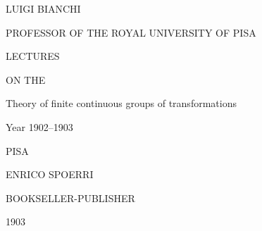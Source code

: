 \documentclass[11pt]{book}
\begin{document}
\begin{titlepage}
\centering
{\Large LUIGI BIANCHI\par}
\vspace{0.4em}
{\small PROFESSOR OF THE ROYAL UNIVERSITY OF PISA\par}
\vfill
{\Huge LECTURES\par}
\vspace{1.5em}
{\large ON THE\par}
\vspace{1.5em}
{\Large Theory of finite continuous groups of transformations\par}
\vspace{2em}
{\large Year 1902--1903\par}
\vfill
{\Large PISA\par}
{\large ENRICO SPOERRI\par}
{\small BOOKSELLER-PUBLISHER\par}
\vspace{0.5em}
{\large 1903\par}
\end{titlepage}

\frontmatter
\end{document}
